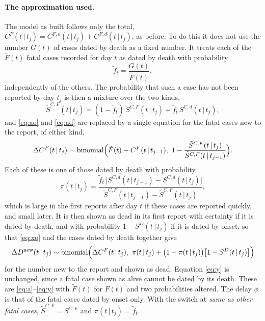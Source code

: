 \documentclass[11pt,a4paper]{article}
\newcommand{\given}{\,|\,}
\newcommand{\bin}{\operatorname{binomial}}
\newcommand{\dnew}{\Delta D^{\mathrm{new}}}
\begin{document}
\paragraph{The approximation used.} The model as built follows only the
total, $C^{F}(t\given t_j)=C^{F,o}(t\given t_j)+C^{F,d}(t\given t_j)$, as before. To
do this it does not use the number $G(t)$ of cases dated by death as a fixed
number. It treats each of the $\tilde{F}(t)$ fatal cases recorded for day
$t$ as dated by death with probability
\[
\tilde{f}_t=\frac{G(t)}{\tilde{F}(t)},
\]
independently of the others. The probability that such a case has not been
reported by day $t_j$ is then a mixture over the two kinds,
\begin{equation}
\tilde{S}^{C,F}(t\given t_j)=(1-\tilde{f}_t)\,S^{C,F}(t\given t_j)
+\tilde{f}_t\,S^{C,d}(t\given t_j),
\label{eq:mixture}
\end{equation}
and \eqref{eq:ao} and \eqref{eq:ad} are replaced by a single equation for
the fatal cases new to the report, of either kind,
\begin{equation}
\Delta C^{F}(t\given t_j)\sim\bin\Bigl(\tilde{F}(t)-C^{F}(t\given t_{j-1}),\
1-\frac{\tilde{S}^{C,F}(t\given t_j)}{\tilde{S}^{C,F}(t\given t_{j-1})}\Bigr).
\label{eq:amix}
\end{equation}
Each of these is one of those dated by death with probability
\begin{equation}
\pi(t\given t_j)=\frac{\tilde{f}_t\,\bigl[S^{C,d}(t\given t_{j-1})-S^{C,d}(t\given t_j)\bigr]}
{\tilde{S}^{C,F}(t\given t_{j-1})-\tilde{S}^{C,F}(t\given t_j)},
\label{eq:pi}
\end{equation}
which is large in the first reports after day $t$ if these cases are
reported quickly, and small later. It is then shown as dead in its first
report with certainty if it is dated by death, and with probability
$1-S^{D}(t\given t_j)$ if it is dated by onset, so that \eqref{eq:xo}
and the cases dated by death together give
\begin{equation}
\dnew(t\given t_j)\sim\bin\Bigl(\Delta C^{F}(t\given t_j),\
\pi(t\given t_j)+\bigl(1-\pi(t\given t_j)\bigr)\bigl[1-S^{D}(t\given t_j)\bigr]\Bigr)
\label{eq:xdated}
\end{equation}
for the number new to the report and shown as dead. Equation \eqref{eq:y} is
unchanged, since a fatal case shown as alive cannot be dated by its death.
These are \eqref{eq:a}--\eqref{eq:y} with $\tilde{F}(t)$ for $F(t)$ and two
probabilities altered. The delay $\phi$ is that of the fatal cases dated by
onset only. With the switch at \emph{same as other fatal cases},
$\tilde{S}^{C,F}=S^{C,F}$ and $\pi(t\given t_j)=\tilde{f}_t$.
\end{document}
